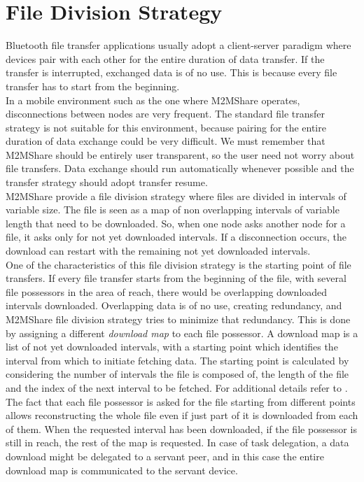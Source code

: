 \section{File Division Strategy}
\label{descrFileDivisionStrategy}
Bluetooth file transfer applications usually adopt a client-server paradigm where devices pair with each other for the entire duration of data transfer. If the transfer is interrupted, exchanged data is of no use. This is because every file transfer has to start from the beginning. 
\\

In a mobile environment such as the one where M2MShare operates, disconnections between nodes are very frequent. The standard file transfer strategy is not suitable for this environment, because pairing for the entire duration of data exchange could be very difficult. We must remember that M2MShare should be entirely user transparent, so the user need not worry about file transfers. Data exchange should run automatically whenever possible and the transfer strategy should adopt transfer resume.
\\

M2MShare provide a file division strategy where files are divided in intervals of variable size. The file is seen as a map of non overlapping intervals of variable length that need to be downloaded. So, when one node asks another node for a file, it asks only for not yet downloaded intervals. If a disconnection occurs, the download can restart with the remaining not yet downloaded intervals.
\\

One of the characteristics of this file division strategy is the starting point of file transfers. If every file transfer starts from the beginning of the file, with several file possessors in the area of reach, there would be overlapping downloaded intervals downloaded. Overlapping data is of no use, creating redundancy, and M2MShare file division strategy tries to minimize that redundancy. This is done by assigning a different \textit{download map} to each file possessor. A download map is a list of not yet downloaded intervals, with a starting point which identifies the interval from which to initiate fetching data. The starting point is calculated by considering the number of intervals the file is composed of, the length of the file and the index of the next interval to be fetched. For additional details refer to \cite{tesiarmir}.
\\

The fact that each file possessor is asked for the file starting from different points allows reconstructing the whole file even if just part of it is downloaded from each of them. When the requested interval has been downloaded, if the file possessor is still in reach, the rest of the map is requested. In case of task delegation, a data download might be delegated to a servant peer, and in this case the entire download map is communicated to the servant device.
 
 

